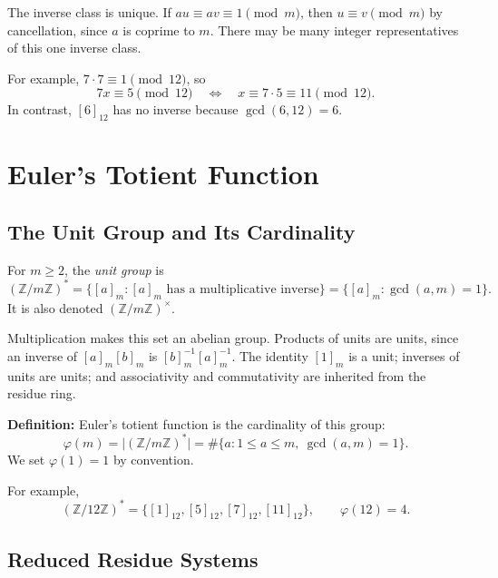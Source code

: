 \documentclass[a4paper,11pt,abstracton]{scrartcl}
\theoremstyle{dotlessP}
\theoremstyle{dotlessS}
\theoremstyle{remark}
\theoremstyle{definition}
\begin{document}
The inverse class is unique. If $au\equiv av\equiv1\pmod m$, then
$u\equiv v\pmod m$ by cancellation, since $a$ is coprime to $m$.
There may be many integer representatives of this one inverse class.


\begin{example_box}
For example, $7\cdot7\equiv1\pmod{12}$, so
\[
    7x\equiv5\pmod{12}
    \quad\Longleftrightarrow\quad
    x\equiv7\cdot5\equiv11\pmod{12}.
\]
In contrast, $[6]_{12}$ has no inverse because $\gcd(6,12)=6$.
\end{example_box}


\section{Euler's Totient Function}

\subsection{The Unit Group and Its Cardinality}


\begin{definition_box}
For $m\geq2$, the \emph{unit group} is
\[
    (\mathbb{Z}/m\mathbb{Z})^*
    =\{[a]_m:[a]_m\text{ has a multiplicative inverse}\}
    =\{[a]_m:\gcd(a,m)=1\}.
\]
It is also denoted $(\mathbb{Z}/m\mathbb{Z})^\times$.
\end{definition_box}


Multiplication makes this set an abelian group. Products of units are
units, since an inverse of $[a]_m[b]_m$ is $[b]_m^{-1}[a]_m^{-1}$.
The identity $[1]_m$ is a unit; inverses of units are units; and
associativity and commutativity are inherited from the residue ring.


\begin{definition_box}
\textbf{Definition:}
Euler's totient function is the cardinality of this group:
\[
    \boxed{\varphi(m)=\bigl|(\mathbb{Z}/m\mathbb{Z})^*\bigr|}
    =\#\{a:1\leq a\leq m,\ \gcd(a,m)=1\}.
\]
We set $\varphi(1)=1$ by convention.
\end{definition_box}

\begin{example_box}
For example,
\[
    (\mathbb{Z}/12\mathbb{Z})^*
    =\{[1]_{12},[5]_{12},[7]_{12},[11]_{12}\},\qquad
    \varphi(12)=4.
\]
\end{example_box}


\subsection{Reduced Residue Systems}
\end{document}
